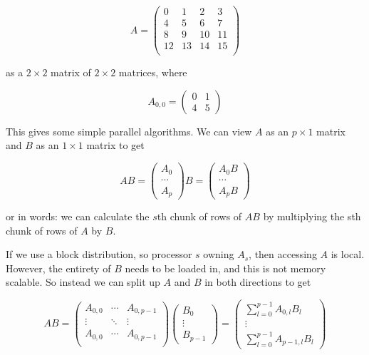 \documentclass{article}
\begin{document}
\[
A = \begin{pmatrix}
    0 & 1 & 2 & 3 \\
    4 & 5 & 6 & 7 \\
    8 & 9 & 10 & 11 \\
    12 & 13 & 14 & 15 \\
    \end{pmatrix}
\]

as a $2 \times 2$ matrix of $2 \times 2$ matrices, where 

\[
A_{0, 0} = \begin{pmatrix}
    0 & 1 \\
    4 & 5
\end{pmatrix}
\]

This gives some simple parallel algorithms. We can view $A$ as an $p \times 1$ matrix and $B$ as an $1 \times 1$ matrix
to get

\[
AB =
\begin{pmatrix}
A_0 \\
\cdots \\
A_p
\end{pmatrix} B = \begin{pmatrix}
A_0 B \\
\cdots \\
A_p B
\end{pmatrix}
\]

or in words: we can calculate the $s$th chunk of rows of $AB$ by multiplying the sth chunk of rows of $A$ by $B$. 

If we use a block distribution, so processor $s$ owning $A_s$, then accessing $A$ is local. However, the entirety 
of $B$ needs to be loaded in, and this is not memory scalable. So instead we can split up $A$ and $B$ in both directions
to get

\[
A B = \begin{pmatrix}
A_{0, 0} & \cdots & A_{0, p - 1} \\
\vdots & \ddots & \vdots \\
A_{0, 0} & \cdots & A_{0, p - 1} \\
\end{pmatrix} \begin{pmatrix}
B_0 \\
\vdots \\
B_{p - 1}
\end{pmatrix} = \begin{pmatrix}
\sum_{l = 0}^{p - 1} A_{0, l} B_l \\
\vdots \\
\sum_{l = 0}^{p - 1} A_{p - 1, l} B_l
\end{pmatrix}
\]
\end{document}
